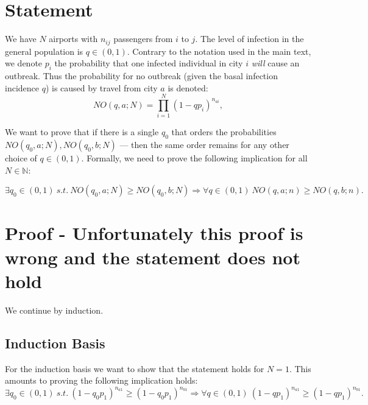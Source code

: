 \documentclass{amsproc}
\begin{document}
\section{Statement}
We have $N$ airports with $n_{ij}$ passengers from $i$ to $j$. The
level of infection in the general population is $q \in
(0,1)$. Contrary to the notation used in the main text, we denote
$p_i$ the probability that one infected individual in city $i$ {\it
  will} cause an outbreak. Thus the probability for no outbreak (given
the basal infection incidence $q$) is caused by travel from city $a$
is denoted:
$$
NO(q,a;N) = \prod_{i=1}^{N} (1 - qp_i)^{n_{ai}},
$$

We want to prove that if there is a single $q_0$ that orders the
probabilities $NO(q_0,a;N), NO(q_0,b;N)$ --- then the same order
remains for any other choice of $q \in (0,1)$. Formally, we need to
prove the following implication for all $N \in \mathbb{N}$:

$$
\exists q_0\in (0,1)\ s.t.\ NO(q_0,a;N) \geq NO(q_0,b;N) \Rightarrow \forall q \in (0,1)\ NO(q,a;n) \geq NO(q,b;n).
$$


\section{Proof - Unfortunately this proof is wrong and the statement does not hold}
We continue by induction.

\subsection{Induction Basis}
For the induction basis we want to show that the statement holds for
$N=1$. This amounts to proving the following implication holds:
$$
\exists q_0 \in (0,1)\ s.t.\ (1-q_0p_1)^{n_{a1}} \geq (1-q_0p_1)^{n_{b1}} \Rightarrow  \forall q \in (0,1)\  (1-qp_1)^{n_{a1}} \geq (1-qp_1)^{n_{b1}}.
$$
\end{document}
